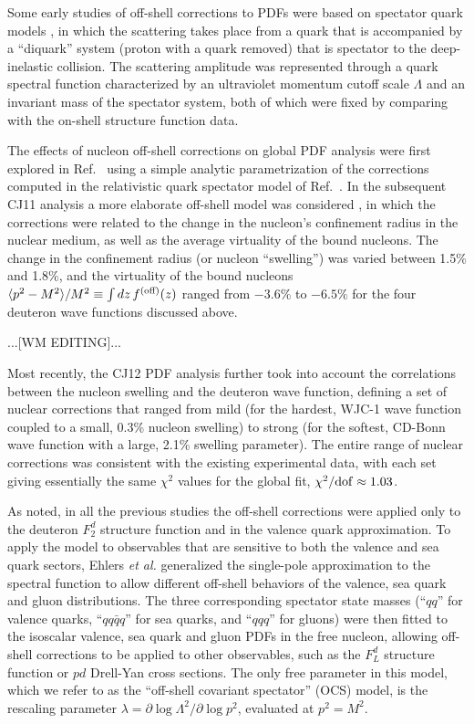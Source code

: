 \documentclass[aps,prd,amsmath,preprint]{revtex4}
\begin{document}
Some early studies of off-shell corrections to PDFs were based on
spectator quark models \cite{MSToff, KPW94, MSTplb, KMPW95, KP06},
in which the scattering takes place from a quark that is accompanied
by a ``diquark'' system (proton with a quark removed) that is
spectator to the deep-inelastic collision.  The scattering amplitude
was represented through a quark spectral function characterized by
an ultraviolet momentum cutoff scale $\Lambda$ and an invariant mass
of the spectator system, both of which were fixed by comparing with
the on-shell structure function data.


The effects of nucleon off-shell corrections on global PDF analysis
were first explored in Ref.~\cite{CJ10} using a simple analytic
parametrization of the corrections computed in the relativistic
quark spectator model of Ref.~\cite{MSTplb}.
%
In the subsequent CJ11 analysis \cite{CJ11} a more elaborate off-shell
model was considered \cite{KP06}, in which the corrections were related
to the change in the nucleon's confinement radius in the nuclear
medium, as well as the average virtuality of the bound nucleons.
The change in the confinement radius (or nucleon ``swelling'') was
varied between 1.5\% and 1.8\%, and the virtuality of the bound
nucleons
  $\langle p^2-M^2 \rangle / M^2 \equiv \int dz\, f^{(\rm off)}(z)$
ranged from $-3.6\%$ to $-6.5\%$ for the four deuteron wave functions
discussed above.


{\color{red} ...[WM EDITING]...}


Most recently, the CJ12 PDF analysis \cite{CJ12} further took into
account the correlations between the nucleon swelling and the deuteron
wave function, defining a set of nuclear corrections that ranged from
mild (for the hardest, WJC-1 wave function \cite{WJC} coupled to a
      small, 0.3\% nucleon swelling) to
strong (for the softest, CD-Bonn wave function \cite{CDBonn} with
      a large, 2.1\% swelling parameter).
The entire range of nuclear corrections was consistent with the
existing experimental data, with each set giving essentially the same
$\chi^2$ values for the global fit, $\chi^2/{\rm dof} \approx 1.03$.


As noted, in all the previous studies the off-shell corrections were
applied only to the deuteron $F_2^d$ structure function and in the
valence quark approximation.  To apply the model to observables that
are sensitive to both the valence and sea quark sectors, Ehlers
{\it et al.} \cite{Ehlers14} generalized the single-pole approximation
to the spectral function to allow different off-shell behaviors of the
valence, sea quark and gluon distributions.
The three corresponding spectator state masses (``$qq$'' for valence
quarks, ``$qq\bar q q$'' for sea quarks, and ``$qqq$'' for gluons)
were then fitted to the isoscalar valence, sea quark and gluon PDFs
in the free nucleon, allowing off-shell corrections to be applied to
other observables, such as the $F_L^d$ structure function or $pd$
Drell-Yan cross sections.
The only free parameter in this model, which we refer to as the
``off-shell covariant spectator'' (OCS) model, is the rescaling
parameter $\lambda = \partial \log\Lambda^2 / \partial \log p^2$,
evaluated at $p^2=M^2$.
\end{document}
